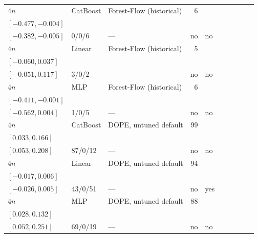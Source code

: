 \begin{longtable}{@{}ll>{\raggedright\arraybackslash}p{1.1in}rllrlll@{}}
$4n$ & CatBoost & Forest-Flow (historical) & 6 & \begin{tabular}[t]{@{}l@{}}$-0.035$\\\tiny$[-0.477, -0.004]$\end{tabular} & \begin{tabular}[t]{@{}l@{}}$-0.231$\\\tiny$[-0.382, -0.005]$\end{tabular} & 0/0/6 & --- & no & no \\
$4n$ & Linear & Forest-Flow (historical) & 5 & \begin{tabular}[t]{@{}l@{}}$0.000$\\\tiny$[-0.060, 0.037]$\end{tabular} & \begin{tabular}[t]{@{}l@{}}$0.002$\\\tiny$[-0.051, 0.117]$\end{tabular} & 3/0/2 & --- & no & no \\
$4n$ & MLP & Forest-Flow (historical) & 6 & \begin{tabular}[t]{@{}l@{}}$-0.027$\\\tiny$[-0.411, -0.001]$\end{tabular} & \begin{tabular}[t]{@{}l@{}}$-0.080$\\\tiny$[-0.562, 0.004]$\end{tabular} & 1/0/5 & --- & no & no \\
$4n$ & CatBoost & DOPE, untuned default & 99 & \begin{tabular}[t]{@{}l@{}}$0.110$\\\tiny$[0.033, 0.166]$\end{tabular} & \begin{tabular}[t]{@{}l@{}}$0.134$\\\tiny$[0.053, 0.208]$\end{tabular} & 87/0/12 & --- & no & no \\
$4n$ & Linear & DOPE, untuned default & 94 & \begin{tabular}[t]{@{}l@{}}$-0.001$\\\tiny$[-0.017, 0.006]$\end{tabular} & \begin{tabular}[t]{@{}l@{}}$-0.003$\\\tiny$[-0.026, 0.005]$\end{tabular} & 43/0/51 & --- & no & yes \\
$4n$ & MLP & DOPE, untuned default & 88 & \begin{tabular}[t]{@{}l@{}}$0.080$\\\tiny$[0.028, 0.132]$\end{tabular} & \begin{tabular}[t]{@{}l@{}}$0.138$\\\tiny$[0.052, 0.251]$\end{tabular} & 69/0/19 & --- & no & no \\

\end{longtable}
